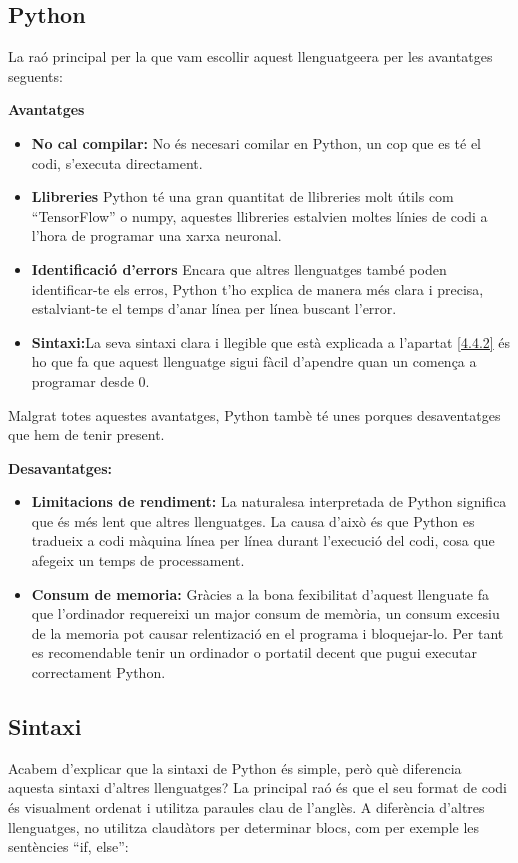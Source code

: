 \subsection{Python}
La raó principal per la que vam escollir aquest llenguatgeera per les avantatges seguents:

\textbf{Avantatges}
\begin{itemize}
 \item \textbf{No cal compilar:} No és necesari comilar en Python, un cop que es té el codi, s'executa directament.
 \item \textbf{Llibreries} Python té una gran quantitat de llibreries molt útils com ``TensorFlow'' o numpy, aquestes llibreries estalvien moltes línies de codi a l'hora de programar una xarxa neuronal.
 \item \textbf{Identificació d'errors} Encara que altres llenguatges també poden identificar-te els erros, Python t'ho explica de manera més clara i precisa, estalviant-te el temps d'anar línea per línea buscant l'error.
 \item \textbf{Sintaxi:}La seva sintaxi clara i llegible que està explicada a l'apartat \ref{4.4.2} és ho que fa que aquest llenguatge sigui fàcil d'apendre quan un comença a programar desde 0.
\end{itemize}

Malgrat totes aquestes avantatges, Python tambè té unes porques desaventatges que hem de tenir present.

\textbf{Desavantatges:}
\begin{itemize}
 \item \textbf{Limitacions de rendiment:} La naturalesa interpretada de Python significa que és més lent que altres llenguatges. La causa d'això és que Python es tradueix a codi màquina línea per línea durant l'execució del codi, cosa que afegeix un temps de processament.
 \item \textbf{Consum de memoria:} Gràcies a la bona fexibilitat d'aquest llenguate fa que l'ordinador requereixi un major consum de memòria, un consum excesiu de la memoria pot causar relentizació en el programa i bloquejar-lo. Per tant es recomendable tenir un ordinador o portatil decent que pugui executar correctament Python.
\end{itemize}

\subsection{Sintaxi}
Acabem d'explicar que la sintaxi de Python és simple, però què diferencia aquesta sintaxi d'altres llenguatges? La principal raó és que el seu format de codi és visualment ordenat i utilitza paraules clau de l'anglès. A diferència d'altres llenguatges, no utilitza claudàtors per determinar blocs, com per exemple les sentències ``if, else'':


